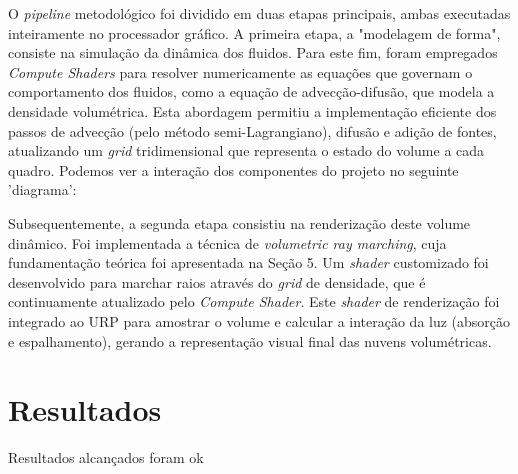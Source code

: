O \textit{pipeline} metodológico foi dividido em duas etapas principais, ambas executadas inteiramente no processador gráfico. A primeira etapa, a "modelagem de forma", consiste na simulação da dinâmica dos fluidos. Para este fim, foram empregados \textit{Compute Shaders} para resolver numericamente as equações que governam o comportamento dos fluidos, como a equação de advecção-difusão, que modela a densidade volumétrica. Esta abordagem permitiu a implementação eficiente dos passos de advecção (pelo método semi-Lagrangiano), difusão e adição de fontes, atualizando um \textit{grid} tridimensional que representa o estado do volume a cada quadro. Podemos ver a interação dos componentes do projeto no seguinte 'diagrama': 



Subsequentemente, a segunda etapa consistiu na renderização deste volume dinâmico. Foi implementada a técnica de \textit{volumetric ray marching}, cuja fundamentação teórica foi apresentada na Seção 5. Um \textit{shader} customizado foi desenvolvido para marchar raios através do \textit{grid} de densidade, que é continuamente atualizado pelo \textit{Compute Shader}. Este \textit{shader} de renderização foi integrado ao URP para amostrar o volume e calcular a interação da luz (absorção e espalhamento), gerando a representação visual final das nuvens volumétricas.


\section{Resultados}
\label{sec:resultados}

Resultados alcançados foram ok
